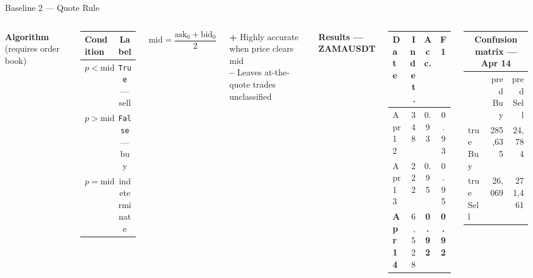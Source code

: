 \documentclass[aspectratio=169,10pt]{beamer}
\newcommand{\code}[1]{\texttt{\small #1}}
\begin{document}
\begin{frame}{Baseline 2 — Quote Rule}
  \begin{columns}[T]
    \textbf{Algorithm} \quad(requires order book)

    \medskip
    \begin{center}
    \begin{tabular}{lc}
      \toprule
      Condition & Label \\
      \midrule
      $p < \text{mid}$ & \code{True}  — sell \\
      $p > \text{mid}$ & \code{False} — buy \\
      $p = \text{mid}$ & indeterminate \\
      \bottomrule
    \end{tabular}
    \end{center}

    \smallskip
    $\text{mid} = \dfrac{\text{ask}_0 + \text{bid}_0}{2}$

    \medskip
    \textcolor{okgreen}{\textbf{+}} Highly accurate when price clears mid\\
    \textcolor{badred}{\textbf{--}} Leaves at-the-quote trades unclassified

    \textbf{Results — ZAMAUSDT}

    \medskip
    \begin{center}
    \begin{tabular}{lrcc}
      \toprule
      Date & Indet. & Acc. & F1 \\
      \midrule
      Apr 12 & 348 & 0.93 & 0.93 \\
      Apr 13 & 222 & 0.95 & 0.95 \\
      \textbf{Apr 14} & 6{,}528 & \textbf{0.92} & \textbf{0.92} \\
      \bottomrule
    \end{tabular}
    \end{center}

    \medskip
    \begin{center}
    \begin{tabular}{lrr}
      \multicolumn{3}{c}{\small Confusion matrix — Apr 14}\\
      \toprule
       & pred Buy & pred Sell \\
      \midrule
      true Buy  & 285{,}635 & 24{,}784 \\
      true Sell & 26{,}069  & 271{,}461 \\
      \bottomrule
    \end{tabular}
    \end{center}
  \end{columns}
\end{frame}
\end{document}

